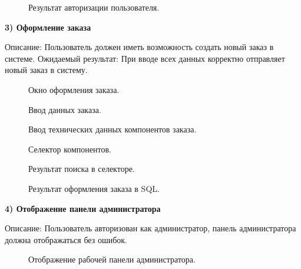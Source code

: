 \begin{figure}[ht]
	\caption{Результат авторизации пользователя.}
	\label{storedf:panel0}
\end{figure}

\newpage

\textbf{3) Оформление заказа}

Описание: Пользователь должен иметь возможность создать новый заказ в системе.
Ожидаемый результат:  При вводе всех данных корректно отправляет новый заказ в систему.

\begin{figure}[ht]
	\caption{Окно оформления заказа.}
	\label{storedf:form0}
\end{figure}

\begin{figure}[ht]
	\caption{Ввод данных заказа.}
	\label{storedf:form1}
\end{figure}

\begin{figure}[ht]
	\caption{Ввод технических данных компонентов заказа.}
	\label{storedf:form2}
\end{figure}

\begin{figure}[ht]
	\caption{Селектор компонентов.}
	\label{storedf:formsearch0}
\end{figure}

\begin{figure}[ht]
	\caption{Результат поиска в селекторе.}
	\label{storedf:formsearch1}
\end{figure}

\begin{figure}[ht]
	\caption{Результат оформления заказа в SQL.}
	\label{storedf:formgg1}
\end{figure}
\clearpage

\textbf{4) Отображение панели администратора}

Описание: Пользователь авторизован как администратор, панель администратора должна отображаться без ошибок. 

\begin{figure}[ht]
	\caption{Отображение рабочей панели администратора.}
	\label{storedf:panel0_}
\end{figure}

